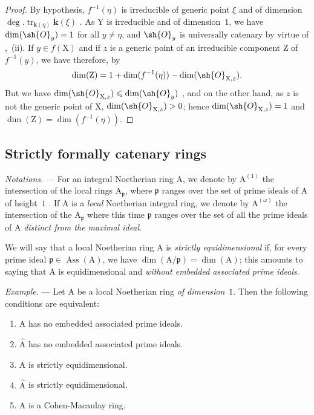 \begin{proof}
By hypothesis, $f^{-1}(\eta)$ is irreducible of generic point $\xi$ and of dimension $\deg.\operatorname{tr}_{\boldsymbol{k}(\eta)}\boldsymbol{k}(\xi)$ .
As $\mathrm{Y}$ is irreducible and of dimension~$1$, we have $\dim(\sh{O}_y)=1$ for all $y\neq\eta$, and $\sh{O}_y$ is universally catenary by virtue of ,~(ii).
If $y\in f(\mathrm{X})$ and if $z$ is a generic point of an irreducible component $\mathrm{Z}$ of $f^{-1}(y)$, we have therefore, by 
\[
  \dim(\mathrm{Z})=1+\dim(f^{-1}(\eta))-\dim(\sh{O}_{\mathrm{X},z}).
\]
But we have $\dim(\sh{O}_{\mathrm{X},z})\leqslant\dim(\sh{O}_y)$ , and on the other hand, as $z$ is not the generic point of $\mathrm{X}$, $\dim(\sh{O}_{\mathrm{X},z})>0$; hence $\dim(\sh{O}_{\mathrm{X},z})=1$ and $\dim(\mathrm{Z})=\dim(f^{-1}(\eta))$.
\end{proof}


\subsection{Strictly formally catenary rings}
\label{subsection:IV.7.2}

\begin{env}[7.2.1]
\label{IV.7.2.1}
\emph{Notations.} ---
For an integral Noetherian ring $\mathrm{A}$, we denote by $\mathrm{A}^{(1)}$ the intersection of the local rings $\mathrm{A}_\mathfrak{p}$, where $\mathfrak{p}$ ranges over the set of prime ideals of $\mathrm{A}$ of height~$1$ .
If $\mathrm{A}$ is a \emph{local} Noetherian integral ring, we denote by $\mathrm{A}^{(\omega)}$ the intersection of the $\mathrm{A}_\mathfrak{p}$ where this time $\mathfrak{p}$ ranges over the set of all the prime ideals of $\mathrm{A}$ \emph{distinct from the maximal ideal}.

We will say that a local Noetherian ring $\mathrm{A}$ is \emph{strictly equidimensional} if, for every prime ideal $\mathfrak{p}\in\operatorname{Ass}(\mathrm{A})$, we have $\dim(\mathrm{A}/\mathfrak{p})=\dim(\mathrm{A})$; this amounts to saying that $\mathrm{A}$ is equidimensional and \emph{without embedded associated prime ideals}.
\end{env}

\begin{env}[7.2.1.1]
\label{IV.7.2.1.1}
\emph{Example.} ---
Let $\mathrm{A}$ be a local Noetherian ring \emph{of dimension}~$1$.
Then the following conditions are equivalent:
\begin{enumerate}[label=\emph{\alph*)}]
  \item $\mathrm{A}$ has no embedded associated prime ideals.
  \item[\emph{a$'$)}] $\widehat{\mathrm{A}}$ has no embedded associated prime ideals.
  \item $\mathrm{A}$ is strictly equidimensional.
  \item[\emph{b$'$)}] $\widehat{\mathrm{A}}$ is strictly equidimensional.
  \item $\mathrm{A}$ is a Cohen-Macaulay ring.
\end{enumerate}
\end{env}

